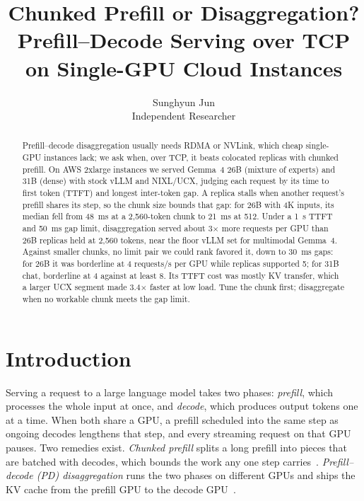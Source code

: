 \documentclass[11pt]{article}
\title{Chunked Prefill or Disaggregation?\\
\large Prefill--Decode Serving over TCP on Single-GPU Cloud Instances}
\author{Sunghyun Jun\\ Independent Researcher\\ \todo{contact email}}
\date{\todo{draft v3, 2026-10-01}}
\begin{document}
\maketitle

\begin{abstract}
Prefill--decode disaggregation usually needs RDMA or NVLink, which cheap single-GPU instances lack; we ask when, over TCP, it beats colocated replicas with chunked prefill. On AWS 2xlarge instances we served Gemma~4 26B (mixture of experts) and 31B (dense) with stock vLLM and NIXL/UCX, judging each request by its time to first token (TTFT) and longest inter-token gap. A replica stalls when another request's prefill shares its step, so the chunk size bounds that gap: for 26B with 4K inputs, its median fell from 48~ms at a 2,560-token chunk to 21~ms at 512. Under a 1~s TTFT and 50~ms gap limit, disaggregation served about 3$\times$ more requests per GPU than 26B replicas held at 2,560 tokens, near the floor vLLM set for multimodal Gemma~4. Against smaller chunks, no limit pair we could rank favored it, down to 30~ms gaps: for 26B it was borderline at 4 requests/s per GPU while replicas supported 5; for 31B chat, borderline at 4 against at least 8. Its TTFT cost was mostly KV transfer, which a larger UCX segment made 3.4$\times$ faster at low load. Tune the chunk first; disaggregate when no workable chunk meets the gap limit.
\end{abstract}

\section{Introduction}

Serving a request to a large language model takes two phases: \emph{prefill}, which processes the whole input at once, and \emph{decode}, which produces output tokens one at a time. When both share a GPU, a prefill scheduled into the same step as ongoing decodes lengthens that step, and every streaming request on that GPU pauses. Two remedies exist. \emph{Chunked prefill} splits a long prefill into pieces that are batched with decodes, which bounds the work any one step carries~\cite{sarathi2023,sarathi}. \emph{Prefill--decode (PD) disaggregation} runs the two phases on different GPUs and ships the KV cache from the prefill GPU to the decode GPU~\cite{distserve,splitwise,mooncake}.
\end{document}
